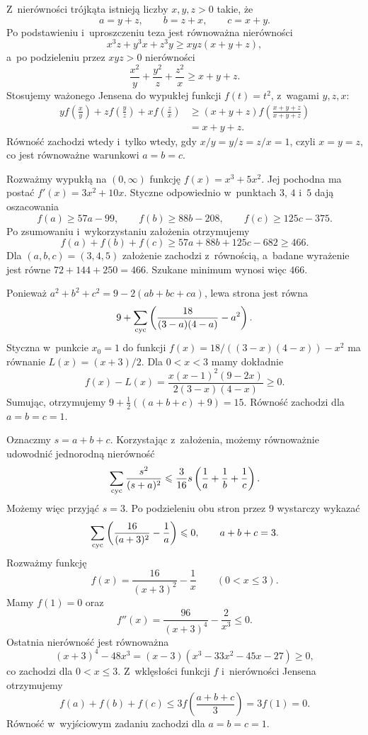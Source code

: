 \documentclass{lecture-kuznia}
\begin{document}
\begin{solution*}[\ref{ZRaviJensen}]
	Z~nierówności trójkąta istnieją liczby $x,y,z>0$ takie, że
	\[
		a=y+z,\qquad b=z+x,\qquad c=x+y.
	\]
	Po podstawieniu i~uproszczeniu teza jest równoważna nierówności
	\[
		x^3z+y^3x+z^3y\geqslant xyz(x+y+z),
	\]
	a~po podzieleniu przez $xyz>0$ nierówności
	\[
		\frac{x^2}{y}+\frac{y^2}{z}+\frac{z^2}{x}\geqslant x+y+z.
	\]
	Stosujemy ważonego Jensena do wypukłej funkcji $f(t)=t^2$, z~wagami
	$y,z,x$:
	\begin{align*}
		yf\left(\frac{x}{y}\right)
		+zf\left(\frac{y}{z}\right)
		+xf\left(\frac{z}{x}\right)
		&\geqslant(x+y+z)
		f\left(\frac{x+y+z}{x+y+z}\right)\\
		&=x+y+z.
	\end{align*}
	Równość zachodzi wtedy i~tylko wtedy, gdy
	$x/y=y/z=z/x=1$, czyli $x=y=z$, co jest równoważne warunkowi
	$a=b=c$.
\end{solution*}

\begin{solution*}[\ref{Z12}]
	Rozważmy wypukłą na $(0,\infty)$ funkcję $f(x)=x^3+5x^2$.
	Jej pochodna ma postać $f'(x)=3x^2+10x$. Styczne odpowiednio
	w~punktach $3$, $4$ i~$5$ dają oszacowania
	\[
		f(a)\geqslant57a-99,\qquad
		f(b)\geqslant88b-208,\qquad
		f(c)\geqslant125c-375.
	\]
	Po zsumowaniu i~wykorzystaniu założenia otrzymujemy
	\[
		f(a)+f(b)+f(c)
		\geqslant57a+88b+125c-682
		\geqslant466.
	\]
	Dla $(a,b,c)=(3,4,5)$ założenie zachodzi z~równością, a~badane
	wyrażenie jest równe $72+144+250=466$. Szukane minimum wynosi więc
	$466$.
\end{solution*}

\begin{solution*}[\ref{Z13}]
	Ponieważ $a^2+b^2+c^2=9-2(ab+bc+ca)$, lewa strona jest równa
	\[
		9+\sum_{\rm cyc}\left(\frac{18}{(3-a)(4-a)}-a^2\right).
	\]
	Styczna w~punkcie $x_0=1$ do funkcji
	$f(x)=18/((3-x)(4-x))-x^2$ ma równanie $L(x)=(x+3)/2$. Dla
	$0<x<3$ mamy dokładnie
	\[
		f(x)-L(x)
		=\frac{x(x-1)^2(9-2x)}{2(3-x)(4-x)}\geqslant0.
	\]
	Sumując, otrzymujemy $9+\frac12((a+b+c)+9)=15$.
	Równość zachodzi dla $a=b=c=1$.
\end{solution*}

\begin{solution*}[\ref{ZHomoJensen}]
	Oznaczmy $s=a+b+c$. Korzystając z~założenia, możemy równoważnie
	udowodnić jednorodną nierówność
	\[
		\sum_{\rm cyc}\frac{s^2}{(s+a)^2}
		\leqslant\frac3{16}s\left(\frac1a+\frac1b+\frac1c\right).
	\]
	Możemy więc przyjąć $s=3$. Po podzieleniu obu stron przez $9$
	wystarczy wykazać
	\[
		\sum_{\rm cyc}\left(\frac{16}{(a+3)^2}-\frac1a\right)\leqslant0,
		\qquad a+b+c=3.
	\]
	Rozważmy funkcję
	\[
		f(x)=\frac{16}{(x+3)^2}-\frac1x
		\qquad(0<x\leqslant3).
	\]
	Mamy $f(1)=0$ oraz
	\[
		f''(x)=\frac{96}{(x+3)^4}-\frac2{x^3}\leqslant0.
	\]
	Ostatnia nierówność jest równoważna
	\[
		(x+3)^4-48x^3
		=(x-3)(x^3-33x^2-45x-27)\geqslant0,
	\]
	co zachodzi dla $0<x\leqslant3$. Z~wklęsłości funkcji $f$ i~nierówności
	Jensena otrzymujemy
	\[
		f(a)+f(b)+f(c)
		\leqslant3f\left(\frac{a+b+c}{3}\right)=3f(1)=0.
	\]
	Równość w~wyjściowym zadaniu zachodzi dla $a=b=c=1$.
\end{solution*}
\end{document}
